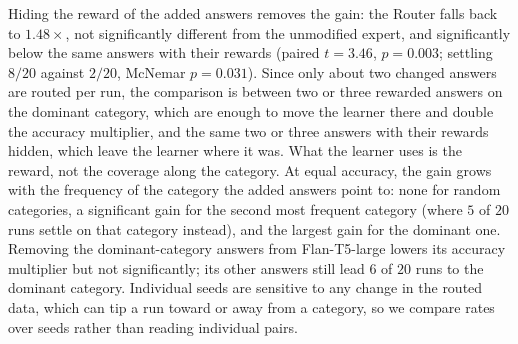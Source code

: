 \documentclass[anon]{alt2027} %
\begin{document}
\begin{table}[h]
\centering
\caption{Changing $15$ of the expert's $10{,}000$ held-out answers. Tests are
paired over $20$ seeds against the unmodified expert: a paired $t$-test on
Router accuracy and an exact McNemar test on whether the run settles on
$1471$.}
\label{tab:inject}
\small
\setlength{\tabcolsep}{4pt}
\end{table}

Hiding the reward of the added answers removes the gain: the Router falls
back to $1.48\times$, not significantly different from the unmodified expert,
and significantly below the same answers with their rewards (paired $t=3.46$,
$p=0.003$; settling $8/20$ against $2/20$, McNemar $p=0.031$). Since only
about two changed answers are routed per run, the comparison is between two
or three rewarded answers on the dominant category, which are enough to move
the learner there and double the accuracy multiplier, and the same two or three
answers with their rewards hidden, which leave the learner where it was. What
the learner uses is the reward, not the coverage along the category. At equal
accuracy, the gain grows with the frequency of the category the
added answers point to: none for random categories, a significant gain for
the second most frequent category (where $5$ of $20$ runs settle on that
category instead), and the largest gain for the dominant one. Removing the
dominant-category answers from Flan-T5-large lowers its accuracy multiplier but not
significantly; its other answers still lead $6$ of $20$ runs to the
dominant category. Individual seeds are sensitive to any change in the
routed data, which can tip a run toward or away from a category, so we
compare rates over seeds rather than reading individual pairs.
\end{document}
